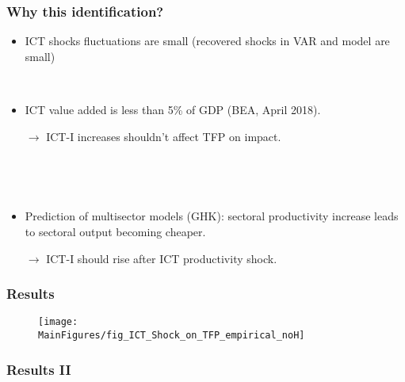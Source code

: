 \documentclass{beamer}
\def \MainFigures{../Draft_Summer2018/MainFigures}
\def\myFigWidth{2.0in}
\begin{document}
\begin{frame}
	\frametitle{Why this identification?}
	
	\begin{itemize}
	
	\item ICT shocks fluctuations are small (recovered shocks in VAR and model are small)
	
	\
	
	\item ICT value added is less than 5\% of GDP (BEA, April 2018). 
	
	$\rightarrow$ ICT-I increases shouldn't affect TFP on impact.
	
	\
	
	\
	
	\item Prediction of multisector models (GHK): sectoral productivity increase leads to sectoral output becoming cheaper. 
	
	$\rightarrow$ ICT-I should rise after ICT productivity shock.
	\end{itemize}

\end{frame}


\begin{frame}
	\frametitle{Results}
	
\begin{figure}[h!]
\begin{center}
\texttt{[image: \\MainFigures/fig\_ICT\_Shock\_on\_TFP\_empirical\_noH]}
\label{fig:TFP_main}
\end{center}
\end{figure}
	

\end{frame}


\begin{frame}
	\frametitle{Results II}
	\label{results2}

\begin{figure}[h!]
{} \hspace{.2in%
} 
 \hspace{.2in%
} 
 \hspace{.2in%
} 
\end{figure}	


\hyperlink{largeVAR}{}	
\end{frame}
\end{document}
